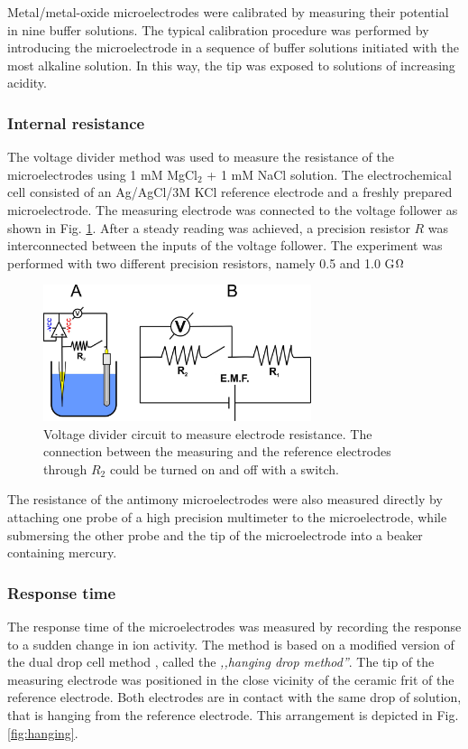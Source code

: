 Metal/metal-oxide microelectrodes were calibrated by measuring their potential in nine buffer solutions.
The typical calibration procedure was performed by introducing the microelectrode in a sequence of buffer solutions initiated with the most alkaline solution.
In this way, the tip was exposed to solutions of increasing acidity.
 
			\subsubsection{Internal resistance}
The voltage divider method was used to measure the resistance of the microelectrodes using 1 mM MgCl$_2$ + 1 mM NaCl solution.
The electrochemical cell consisted of an Ag/AgCl/3M KCl reference electrode and a freshly prepared microelectrode.
The measuring electrode was connected to the voltage follower as shown in Fig. \ref{fig:divider}.
After a steady reading was achieved, a precision resistor $R$ was interconnected between the inputs of the voltage follower.
The experiment was performed with two different precision resistors, namely 0.5 and 1.0 G$\ohm$

\begin{figure}
\centering
\includegraphics[width=0.7\textwidth]{img/divider_switch.jpg}
\caption[Voltage divider circuit to measure electrode resistance]{Voltage divider circuit to measure electrode resistance.
The connection between the measuring and the reference electrodes through $R_2$ could be turned on and off with a switch.} 
\label{fig:divider}
\end{figure}

The resistance of the antimony microelectrodes were also measured directly by attaching one probe of a high precision multimeter to the microelectrode, while submersing the other probe and the tip of the microelectrode into a beaker containing mercury.

			\subsubsection{Response time}
The response time of the microelectrodes was measured by recording the response to a sudden change in ion activity. The method is based on a modified version of the dual drop cell method \cite{lamaka2009novel}, called the \emph{,,hanging drop method''}.
The tip of the measuring electrode was positioned in the close vicinity of the ceramic frit of the reference electrode. Both electrodes are in contact with the same drop of solution, that is hanging from the reference electrode. This arrangement is depicted in Fig. \ref{fig:hanging}.

